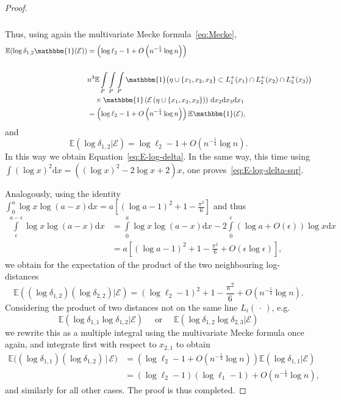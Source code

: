 \documentclass[10pt]{amsart}
\theoremstyle{definition}\newtheorem{defi}[theo]{Definition}\newtheorem{rema}[theo]{Remark}\newtheorem{exam}[theo]{Example}\newtheorem{exem}[theo]{Example}\newtheorem{nota}[theo]{Notation}
\newcommand{\ind}{\mathbbm{1}}
\newcommand{\bbE}{\mathbb{E}}
\newcommand{\clE}{\mathcal{E}}
\begin{document}
\begin{proof}
\begin{multline*}
\begin{aligned}
\end{aligned}
\end{multline*}
Thus, using again the multivariate Mecke formula~\eqref{eq:Mecke},
\begin{align*}
\bbE (\log \delta_{1,2} \ind(\clE)) &= \left(\log \ell_2 - 1 +O\left(n^{- \frac 14} \log n\right)\right) \\
\\ & n^3 \bbE \int\limits_{P}\int\limits_{P}\int\limits_{P}
\ind\big(\eta\cup\{x_1,x_2,x_3\}\subset L_1^+(x_1) \cap L_2^+ (x_2) \cap L_3^+ (x_3)\big)
\\ &\quad\times
\ind\left(\clE\left(\eta\cup\{x_1,x_2,x_3\}\right)\right)\, \mathrm{d} x_2 \mathrm{d} x_3 \mathrm{d} x_1
\\&= \left(\log \ell_2 - 1 +O\left(n^{- \frac 14} \log n\right)\right) \bbE \ind (\clE),
\end{align*}
and
\[
\bbE (\log \delta_{1,2} |\clE) =
\log \ell_2 - 1 +O(n^{- \frac 14} \log n).
\]
In this way we obtain Equation~\eqref{eq:E-log-delta}. In the same way, this time using $ \int (\log x)^2 \mathrm{d} x = ((\log x)^2 - 2 \log x +2) x $, one proves~\eqref{eq:E-log-delta-sqr}.

Analogously, using the identity $\int_0^{a} \log x \log(a-x) \mathrm{d} x = a [(\log a -1)^2 + 1 - \frac {\pi^2}6]$ and thus
\begin{align*}
\int\limits_\epsilon^{a-\epsilon} \log x \log(a-x) \mathrm{d} x &=
\int\limits_0^{a} \log x \log(a-x) \mathrm{d} x - 2 \int\limits_0^{\epsilon} (\log a+ O(\epsilon)) \log x \mathrm{d} x
\\ &= a \left[(\log a -1)^2 + 1 - \frac {\pi^2}6 + O(\epsilon \log \epsilon)\right],
\end{align*}
we obtain for the expectation of the product of the two neighbouring log-distances
\[
\bbE ((\log \delta_{1,2})(\log \delta_{2,2})| \clE) = (\log \ell_2 -1)^2 + 1- \frac {\pi^2}6 + O\left(n^{- \frac 14} \log n\right).
\]
Considering the product of two distances not on the same line $L_i(\,\cdot\,)$, e.g.
\[
\bbE \left(\log \delta_{1,1} \log \delta_{1,2} | \clE\right)
\quad\text{ or }\quad
\bbE (\log \delta_{1,2} \log \delta_{2,3} | \clE)
\]
we rewrite this as a multiple integral using the multivariate Mecke formula once again, and integrate first with respect to $x_{2,1}$ to obtain
\begin{align*}
\bbE \big((\log \delta_{1,1})(\log \delta_{1,2})\,\big|\, \clE\big) &= \left(\log \ell_2 - 1 +O\left(n^{- \frac 14} \log n\right)\right) \bbE (\log \delta_{1,1} | \clE)
\\ &= (\log \ell_2 - 1) (\log \ell_1 - 1) +O\left(n^{- \frac 14} \log n\right),
\end{align*}
and similarly for all other cases. The proof is thus completed.
\end{proof}
\end{document}
